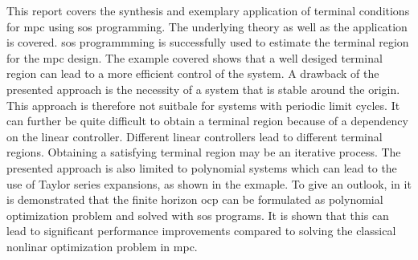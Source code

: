 \documentclass[10pt,a4paper]{article}
\begin{document}
This report covers the synthesis and exemplary application of terminal conditions for \gls{mpc} using \gls{sos} programming. The underlying theory as well as the 
application is covered. \gls{sos} programmming is successfully used to estimate the terminal region for the \gls{mpc} design. The example covered shows that a 
well desiged terminal region can lead to a more efficient control of the system. A drawback of the presented approach is the necessity of a system that is 
stable around the origin. This approach is therefore not suitbale for systems with periodic limit cycles.  It can further be quite difficult to obtain a 
terminal region because of a dependency on the linear controller. Different linear controllers lead to different terminal regions. Obtaining a satisfying terminal
region may be an iterative process. The presented approach is also limited to polynomial systems which can lead to the use of Taylor series expansions, as 
shown in the exmaple. To give an outlook, in \cite{RaffAllgoewer} it is demonstrated that the finite horizon \gls{ocp} can be formulated as polynomial optimization problem and solved with \gls{sos} programs.
It is shown that this can lead to significant performance improvements compared to solving the classical nonlinar optimization problem in \gls{mpc}. 




\pagebreak



\pagebreak
\listoftodos

\end{document}
